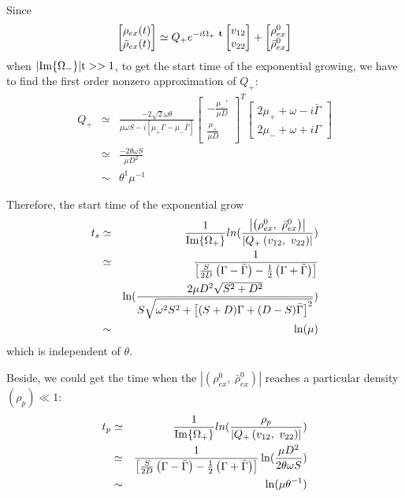 \documentclass[aps,prd,twocolumn,amsmath,amssymb,groupedaddress]{revtex4-2}
\begin{document}
Since 
\begin{eqnarray}
	\begin{bmatrix}
		\rho_{ex} (t)\\ \bar{\rho}_{ex} (t)
	\end{bmatrix}
	\simeq
	Q_+e^{-i \Omega_{+} ~\bf{t}}
	\begin{bmatrix}
		v_{12}  \\ v_{22}
	\end{bmatrix} + 
	\begin{bmatrix} 
		\rho^0_{ex} \\ \bar{\rho}^0_{ex}
	\end{bmatrix}
\end{eqnarray}
when $|\rm{Im}\{\Omega_-\}| t>>1$, to get the start time of the exponential growing, we have to find the first order nonzero approximation of $Q_+$:
\begin{eqnarray}
	Q_+	&\simeq&
	\frac{-2\sqrt{2}\omega \theta}{\mu \omega S - i \left[\mu_+ \Gamma - \mu_- \bar{\Gamma} \right]}
	\begin{bmatrix}
		-\frac{\mu_-'}{\mu D} \\ \frac{\mu_+}{\mu D}
	\end{bmatrix}^T
	\begin{bmatrix}
		2\mu_+ + \omega - i \bar{\Gamma} \\ 2\mu_- + \omega + i \Gamma
	\end{bmatrix} \nonumber \\
	&\simeq&
	\frac{-2 \theta\omega S}{\mu D^2}\\
	&\sim&
	\theta^1 \mu^{-1}
\end{eqnarray}

Therefore, the start time of the exponential grow
\begin{eqnarray}
	t_s	&\simeq& 
	\frac{1}{\rm{Im}\{\Omega_+\}}ln(\frac{\left| \left(\rho^0_{ex}, ~\bar{\rho}^0_{ex}\right) \right|}{\left|Q_+\left(v_{12}, ~ v_{22}\right)\right|})	\nonumber \\
	&\simeq&
	\frac{1}{\left[\frac{S}{2D}\left(\Gamma-\bar{\Gamma}\right)-\frac{1}{2}\left(\Gamma+\bar{\Gamma}\right)\right]} \nonumber \\
	&&\ln(\frac{2\mu D^2\sqrt{S^2+D^2}}{S\sqrt{\omega^2S^2+\left[(S+D) \Gamma + (D-S) \bar{\Gamma}\right]^2}}) \\
	&\sim& \ln(\mu)
\end{eqnarray}
which is independent of $\theta$.

Beside, we could get the time when the $\left| \left(\rho^0_{ex}, ~\bar{\rho}^0_{ex}\right) \right|$ reaches a particular density $(\rho_{p}) \ll 1$:
\begin{eqnarray}
	t_{p}	&\simeq& 
	\frac{1}{\rm{Im}\{\Omega_+\}}ln(\frac{\rho_{p}}{\left|Q_+\left(v_{12}, ~ v_{22}\right)\right|})	\nonumber \\
	&\simeq&
	\frac{1}{\left[\frac{S}{2D}\left(\Gamma-\bar{\Gamma}\right)-\frac{1}{2}\left(\Gamma+\bar{\Gamma}\right)\right]} \ln(\frac{\mu D^2}{2\theta \omega S}) \\
	&\sim& \ln(\mu \theta^{-1})
\end{eqnarray}
\end{document}
